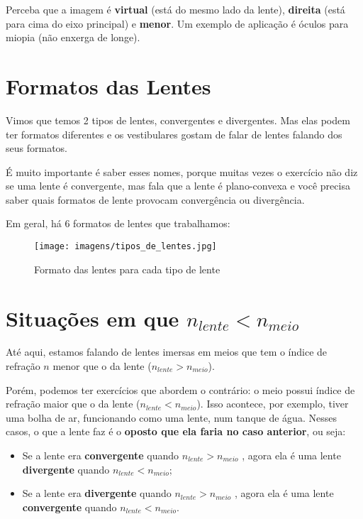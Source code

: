 \documentclass[12pt]{extarticle}
\newcommand{\<}{\langle}
\renewcommand{\>}{\rangle}
\theoremstyle{definition}
\begin{document}
Perceba que a imagem é \textbf{virtual} (está do mesmo lado da lente), \textbf{direita} (está para cima do eixo principal) e \textbf{menor}. Um exemplo de aplicação é óculos para miopia (não enxerga de longe).

\section{Formatos das Lentes}
Vimos que temos 2 tipos de lentes, convergentes e divergentes. Mas elas podem ter formatos diferentes e os vestibulares gostam de falar de lentes falando dos seus formatos.

É muito importante é saber esses nomes, porque muitas vezes o exercício não diz se uma lente é convergente, mas fala que a lente é plano-convexa e você precisa saber quais formatos de lente provocam convergência ou divergência.

Em geral, há 6 formatos de lentes que trabalhamos:

\begin{figure} [H]
    \centering
    \texttt{[image: imagens/tipos\_de\_lentes.jpg]}
    \caption{Formato das lentes para cada tipo de lente \cite{brasilescola}}
    \label{fig:formato_lentes}
\end{figure}

\section{Situações em que $n_{lente}< n_{meio}$}

Até aqui, estamos falando de lentes imersas em meios que tem o índice de refração $n$ menor que o da lente ($n_{lente} > n_{meio}$).

Porém, podemos ter exercícios que abordem o contrário: o meio possui índice de refração maior que o da lente ($n_{lente} < n_{meio}$). Isso acontece, por exemplo, tiver uma bolha de ar, funcionando como uma lente, num tanque de água. Nesses casos, o que a lente faz é o \textbf{oposto que ela faria no caso anterior}, ou seja:
\begin{itemize}
    \item 
    Se a lente era \textbf{convergente} quando $n_{lente} > n_{meio}$ , agora ela é uma lente \textbf{divergente} quando $n_{lente} < n_{meio}$;
    \item
    Se a lente era \textbf{divergente} quando $n_{lente} > n_{meio}$ , agora ela é uma lente \textbf{convergente} quando $n_{lente} < n_{meio}$.
\end{itemize}
\end{document}
